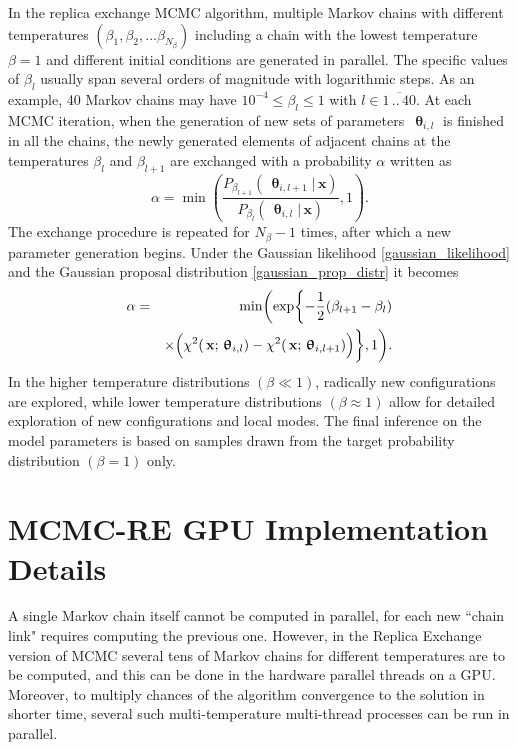 \documentclass[preprint2]{aastex}
\newcommand{\bfx}{\,\mathbf{x}}
\newcommand{\bfth}{\,\bm{\uptheta}}
\begin{document}
In the replica exchange MCMC algorithm, multiple Markov chains with different temperatures $(\beta_1,\beta_2, ... \beta_{N_\beta})$ including a chain with the lowest temperature $\beta=1$ and different initial conditions are generated in parallel. The specific values of $\beta_l$ usually span several orders of magnitude with logarithmic steps. As an example, 40 Markov chains may have $10^{-4} \leqslant \beta_l \leqslant 1$ with $l \in \overline{1\,..\,40}$. At each MCMC iteration, when the generation of new sets of parameters $\bfth_{i,l}$ is finished in all the chains, the newly generated elements of adjacent chains at the temperatures $\beta_l$ and $\beta_{l+1}$ are exchanged with a probability $\alpha$ written as
\begin{equation}
  \label{exchange_probab}
  \alpha =  \min \left( \frac{P_{\beta_{l+1}}(\bfth_{i,l+1}|\bfx)} 
            {P_{\beta_{l}}(\bfth_{i,l}|\bfx)}, 1 \right) .
\end{equation}
The exchange procedure is repeated for $N_\beta - 1$ times, after which a new parameter generation begins. Under the Gaussian  likelihood \eqref{gaussian_likelihood} and the Gaussian proposal distribution \eqref{gaussian_prop_distr} it becomes
\begin{eqnarray}
  \label{accept_probab_beta2}
  \alpha &=& \min \biggl( \exp \biggl\lbrace -\frac{1}{2}(\beta_{l+1} - \beta_{l}) \nonumber \\
         &&\times  \Bigl( \chi^2(\bfx;\bfth_{i,l}) -
                 \chi^2(\bfx;\bfth_{i,l+1}) \Bigr) \biggr\rbrace, 1 \biggr)      .
\end{eqnarray}
In the higher temperature distributions $(\beta \ll 1)$, radically new configurations are explored, while lower temperature distributions  $(\beta \approx 1)$ allow for detailed exploration of new configurations and local modes. The final inference on the model parameters is based on samples drawn from the target probability distribution $(\beta=1)$ only.




\section{MCMC-RE GPU Implementation Details}

A single Markov chain itself cannot be computed in parallel, for each new ``chain link"
requires computing the previous one. However, in the Replica Exchange
version of MCMC several tens of Markov chains for different temperatures
are to be computed, and this can be done in the hardware parallel threads
on a GPU. Moreover, to multiply chances of the algorithm convergence
to the solution in shorter time, several such multi-temperature multi-thread 
processes can be run in parallel.
\end{document}
